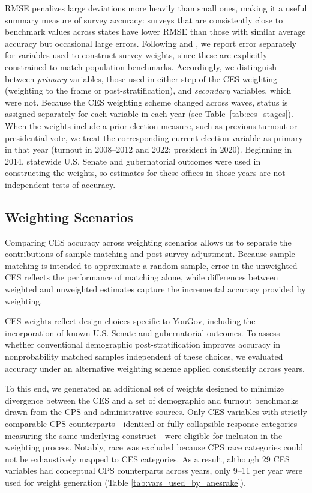 \documentclass[12pt]{article}
\begin{document}

RMSE penalizes large deviations more heavily than small ones, making it a useful summary measure of survey accuracy: surveys that are consistently close to benchmark values across states have lower RMSE than those with similar average accuracy but occasional large errors. Following \textcite{macinnis_accuracy_2018} and \textcite{yeager_comparing_2011}, we report error separately for variables used to construct survey weights, since these are explicitly constrained to match population benchmarks. Accordingly, we distinguish between \textit{primary} variables, those used in either step of the CES weighting (weighting to the frame or post-stratification), and \textit{secondary} variables, which were not. Because the CES weighting scheme changed across waves, status is assigned separately for each variable in each year (see Table~\ref{tab:ces_stages}). When the weights include a prior-election measure, such as previous turnout or presidential vote, we treat the corresponding current-election variable as primary in that year (turnout in 2008--2012 and 2022; president in 2020). Beginning in 2014, statewide U.S. Senate and gubernatorial outcomes were used in constructing the weights, so estimates for these offices in those years are not independent tests of accuracy.

\subsection{Weighting Scenarios}
Comparing CES accuracy across weighting scenarios allows us to separate the contributions of sample matching and post-survey adjustment. Because sample matching is intended to approximate a random sample, error in the unweighted CES reflects the performance of matching alone, while differences between weighted and unweighted estimates capture the incremental accuracy provided by weighting.

CES weights reflect design choices specific to YouGov, including the incorporation of known U.S. Senate and gubernatorial outcomes. To assess whether conventional demographic post-stratification improves accuracy in nonprobability matched samples independent of these choices, we evaluated accuracy under an alternative weighting scheme applied consistently across years. 

To this end, we generated an additional set of weights designed to minimize divergence between the CES and a set of demographic and turnout benchmarks drawn from the CPS and administrative sources. Only CES variables with strictly comparable CPS counterparts—identical or fully collapsible response categories measuring the same underlying construct—were eligible for inclusion in the weighting process. Notably, race was excluded because CPS race categories could not be exhaustively mapped to CES categories. As a result, although 29 CES variables had conceptual CPS counterparts across years, only 9–11 per year were used for weight generation (Table \ref{tab:vars_used_by_anesrake}). 
\end{document}
